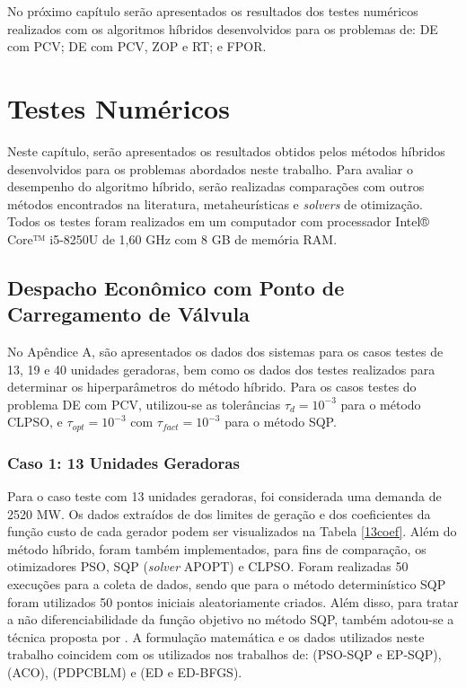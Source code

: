 \documentclass[
	12pt,				%
	openany,			%
	twoside,			%
	a4paper,			%
	chapter=TITLE,		%
	section=Title,		%
	subsection=Title,	%
	subsubsection=Title,%
	english,			%
	french,				%
	spanish,			%
	brazil			%
	]{abntex2}
\begin{document}
\begin{ERRATA}
{No próximo capítulo serão apresentados os resultados dos testes numéricos realizados com os algoritmos híbridos desenvolvidos para os problemas de: DE com PCV; DE com PCV, ZOP e RT; e FPOR.


\chapter{Testes Numéricos}

Neste capítulo, serão apresentados os resultados obtidos pelos métodos híbridos desenvolvidos para os problemas abordados neste trabalho. Para avaliar o desempenho do algoritmo híbrido, serão realizadas comparações com outros métodos encontrados na literatura, metaheurísticas e \emph{solvers} de otimização. Todos os testes foram realizados em um computador com processador Intel® Core™ i5-8250U de 1,60 GHz com 8 GB de memória RAM.

\section{Despacho Econômico com Ponto de Carregamento de Válvula}

No Apêndice A, são apresentados os dados dos sistemas para os casos testes de 13, 19 e 40 unidades geradoras, bem como os dados dos testes realizados para determinar os hiperparâmetros do método híbrido. Para os casos testes do problema DE com PCV, utilizou-se as tolerâncias $\tau_d = 10^{-3}$ para o método CLPSO, e $\tau_{opt} = 10^{-3}$ com $\tau_{fact} = 10^{-3}$ para o método SQP.

\subsection{Caso 1: 13 Unidades Geradoras}

 Para o caso teste com 13 unidades geradoras, foi considerada uma demanda de 2520 MW. Os dados extraídos de  dos limites de geração e dos coeficientes da função custo de cada gerador podem ser visualizados na Tabela \ref{13coef}. Além do método híbrido, foram também implementados, para fins de comparação, os otimizadores PSO, SQP (\emph{solver} APOPT) e CLPSO. Foram realizadas 50 execuções para a coleta de dados, sendo que para o método determinístico SQP foram utilizados 50 pontos iniciais aleatoriamente criados. Além disso, para tratar a não diferenciabilidade da função objetivo no método SQP, também adotou-se a técnica proposta por . A formulação matemática e os dados utilizados neste trabalho coincidem com os utilizados nos trabalhos de:  (PSO-SQP e EP-SQP),  (ACO),  (PDPCBLM) e  (ED e ED-BFGS). 
 
}
\end{ERRATA}
\end{document}
